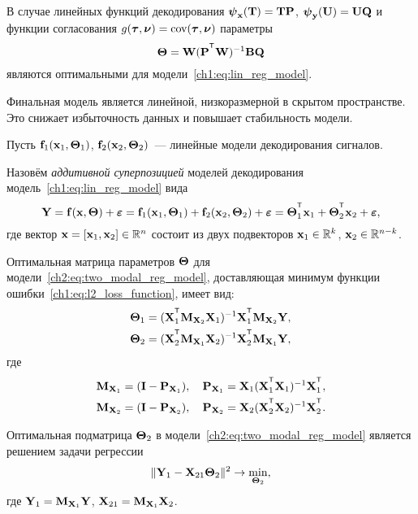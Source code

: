 \documentclass[11pt, a5paper]{dissert}
\begin{document}
\begin{theorem}
	В случае линейных функций декодирования $\boldsymbol{\psi}_{\mathbf{x}}(\mathbf{T}) = \mathbf{T} \mathbf{P}$, $\boldsymbol{\psi}_{\mathbf{y}} (\mathbf{U}) = \mathbf{U} \mathbf{Q}$ и функции согласования $g(\boldsymbol{\tau}, \boldsymbol{\nu}) = \textnormal{cov}(\boldsymbol{\tau}, \boldsymbol{\nu})$ параметры
	\[
		\bTheta = \bW (\bP^{\T} \bW)^{-1} \bB \bQ
	\]
	являются оптимальными для модели~\eqref{ch1:eq:lin_reg_model}.
\end{theorem}

Финальная модель является линейной, низкоразмерной в скрытом пространстве. 
Это снижает избыточность данных и повышает стабильность модели.

Пусть $\mathbf{f}_1(\mathbf{x}_1, \boldsymbol{\Theta}_1)$, $\mathbf{f}_2(\mathbf{x}_2, \boldsymbol{\Theta}_2)$~--- линейные модели декодирования сигналов. 
\begin{definition}
	Назовём \textit{аддитивной суперпозицией} моделей декодирования модель~\eqref{ch1:eq:lin_reg_model} вида
	\begin{equation}
		\bY = \mathbf{f}(\bx, \bTheta) + \bepsilon = \mathbf{f}_1(\bx_1, \bTheta_1) + \mathbf{f}_2(\bx_2, \bTheta_2) + \bepsilon = \bTheta_1^{\T} \bx_1 + \bTheta_2^{\T} \bx_2 + \bepsilon,
		\label{ch2:eq:two_modal_reg_model}
	\end{equation}
	где вектор $\mathbf{x} = [\mathbf{x}_1, \mathbf{x}_2] \in \mathbb{R}^n$ состоит из двух подвекторов $\mathbf{x}_1 \in \mathbb{R}^k$, $\mathbf{x}_2 \in \mathbb{R}^{n - k}$. 
\end{definition}

\begin{statement}
	\label{ch2:stat:two_modal_params}
	Оптимальная матрица параметров $\boldsymbol{\Theta}$ для модели~\eqref{ch2:eq:two_modal_reg_model}, доставляющая минимум функции ошибки~\eqref{ch1:eq:l2_loss_function}, имеет вид:
	\begin{align*}
		\bTheta_1 &= (\bX_1^{\T} \bM_{\bX_2} \bX_1)^{-1} \bX_1^{\T} \bM_{\bX_2} \bY, \\
		\bTheta_2 &= (\bX_2^{\T} \bM_{\bX_1} \bX_2)^{-1} \bX_2^{\T} \bM_{\bX_1} \bY,
	\end{align*}
	где 
	\begin{align*}
		\bM_{\bX_1} = (\bI - \bP_{\bX_1}), \quad \bP_{\bX_1} = \bX_1 (\bX_1^{\T} \bX_1)^{-1} \bX_1^{\T}, \\
		\bM_{\bX_2} = (\bI - \bP_{\bX_2}), \quad \bP_{\bX_2} = \bX_2 (\bX_2^{\T} \bX_2)^{-1} \bX_2^{\T}.
	\end{align*}
\end{statement}

\begin{statement}
	\label{ch2:stat:two_modal_theta2}
	Оптимальная подматрица $\boldsymbol{\Theta}_2$ в модели~\eqref{ch2:eq:two_modal_reg_model} является решением задачи регрессии
	\begin{equation}
		\| \mathbf{Y}_1 -  \mathbf{X}_{21} \boldsymbol{\Theta}_2 \|^2 \rightarrow \min_{\boldsymbol{\Theta}_2},
		\label{ch2:eq:two_modal_fwl}
	\end{equation}
	где $\mathbf{Y}_1 = \mathbf{M}_{\mathbf{X}_1} \mathbf{Y}$, $\mathbf{X}_{21} = \mathbf{M}_{\mathbf{X}_1} \mathbf{X}_2$.
\end{statement}
\end{document}
